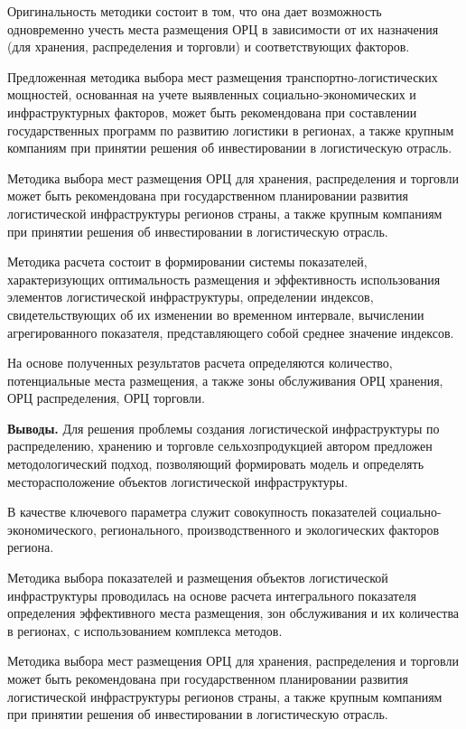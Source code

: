 \begin{multicols}{2}
Оригинальность методики состоит в том, что она дает возможность
одновременно учесть места размещения ОРЦ в зависимости от их назначения
(для хранения, распределения и торговли) и соответствующих факторов.

Предложенная методика выбора мест размещения транспортно-логистических
мощностей, основанная на учете выявленных социально-экономических и
инфраструктурных факторов, может быть рекомендована при составлении
государственных программ по развитию логистики в регионах, а также
крупным компаниям при принятии решения об инвестировании в логистическую
отрасль.

Методика выбора мест размещения ОРЦ для хранения, распределения и
торговли может быть рекомендована при государственном планировании
развития логистической инфраструктуры регионов страны, а также крупным
компаниям при принятии решения об инвестировании в логистическую
отрасль.

Методика расчета состоит в формировании системы показателей,
характеризующих оптимальность размещения и эффективность использования
элементов логистической инфраструктуры, определении индексов,
свидетельствующих об их изменении во временном интервале, вычислении
агрегированного показателя, представляющего собой среднее значение
индексов.

На основе полученных результатов расчета определяются количество,
потенциальные места размещения, а также зоны обслуживания ОРЦ хранения,
ОРЦ распределения, ОРЦ торговли.

{\bfseries Выводы.} Для решения проблемы создания логистической
инфраструктуры по распределению, хранению и торговле сельхозпродукцией
автором предложен методологический подход, позволяющий формировать
модель и определять месторасположение объектов логистической
инфраструктуры.

В качестве ключевого параметра служит совокупность показателей
социально-экономического, регионального, производственного и
экологических факторов региона.

Методика выбора показателей и размещения объектов логистической
инфраструктуры проводилась на основе расчета интегрального показателя
определения эффективного места размещения, зон обслуживания и их
количества в регионах, с использованием комплекса методов.

Методика выбора мест размещения ОРЦ для хранения, распределения и
торговли может быть рекомендована при государственном планировании
развития логистической инфраструктуры регионов страны, а также крупным
компаниям при принятии решения об инвестировании в логистическую
отрасль.


\end{multicols}

